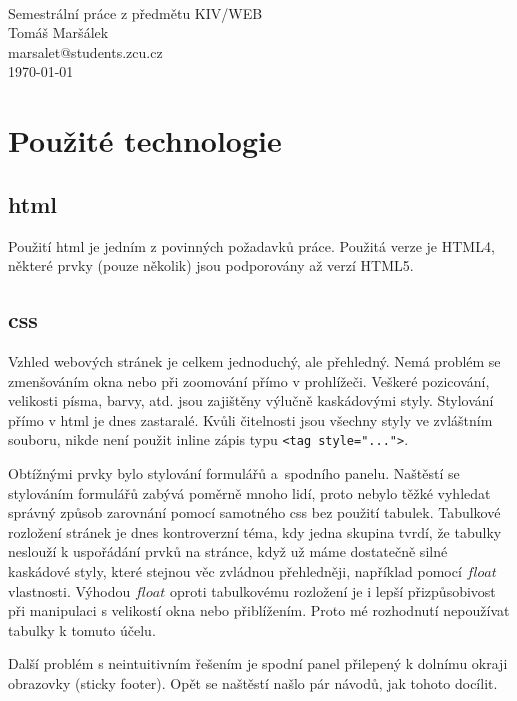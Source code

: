 \documentclass[12pt]{article}
\begin{document}
\begin{titlepage}
\begin{center}
\mbox{} \\[3cm]
\huge{Semestrální práce z předmětu KIV/WEB} \\[2cm]
\Large{Tomáš Maršálek} \\
\large{marsalet@students.zcu.cz} \\[1cm]
\normalsize{\today}
\end{center}
\end{titlepage}

\section{Použité technologie}
\subsection{html}
Použití html je jedním z povinných požadavků práce. Použitá verze je HTML4, 
některé prvky (pouze několik) jsou podporovány až verzí HTML5.

\subsection{css}
Vzhled webových stránek je celkem jednoduchý, ale přehledný. Nemá problém se
zmenšováním okna nebo při zoomování přímo v prohlížeči. Veškeré pozicování,
velikosti písma, barvy, atd. jsou zajištěny výlučně kaskádovými styly.
Stylování přímo v html je dnes zastaralé. Kvůli čitelnosti jsou všechny styly
ve zvláštním souboru, nikde není použit inline zápis typu 
\verb|<tag style="...">|. 

Obtížnými prvky bylo stylování formulářů a~spodního panelu. Naštěstí se
stylováním formulářů zabývá poměrně mnoho lidí, proto nebylo těžké vyhledat
správný způsob zarovnání pomocí samotného css bez použití tabulek. Tabulkové
rozložení stránek je dnes kontroverzní téma, kdy jedna skupina tvrdí, že
tabulky neslouží k uspořádání prvků na stránce, když už máme dostatečně silné
kaskádové styly, které stejnou věc zvládnou přehledněji, například pomocí
$float$ vlastnosti.  Výhodou $float$ oproti tabulkovému rozložení je i lepší
přizpůsobivost při manipulaci s velikostí okna nebo přiblížením.  Proto mé
rozhodnutí nepoužívat tabulky k tomuto účelu.

Další problém s neintuitivním řešením je spodní panel přilepený
k dolnímu okraji obrazovky (sticky footer). Opět se naštěstí našlo pár návodů,
jak tohoto docílit.
\end{document}
